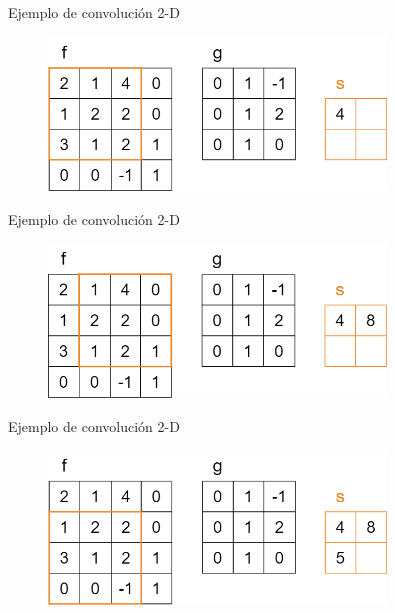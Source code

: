 \begin{frame}{Ejemplo de convolución 2-D}
\begin{figure}
    \centering
    \includegraphics[width=0.8\textwidth]{Slides/figures/Tema 2/Convolucion2D_2.png}
\end{figure}
\end{frame}

\begin{frame}{Ejemplo de convolución 2-D}
\begin{figure}
    \centering
    \includegraphics[width=0.8\textwidth]{Slides/figures/Tema 2/Convolucion2D_3.png}
\end{figure}
\end{frame}

\begin{frame}{Ejemplo de convolución 2-D}
\begin{figure}
    \centering
    \includegraphics[width=0.8\textwidth]{Slides/figures/Tema 2/Convolucion2D_4.png}
\end{figure}
\end{frame}

